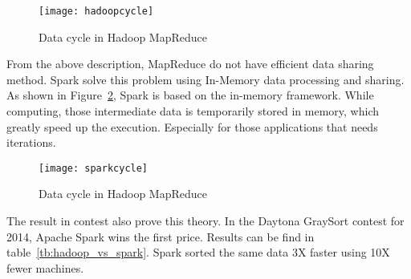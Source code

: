 \begin{figure}[h]
	\centering
	\texttt{[image: hadoopcycle]}
	\caption{Data cycle in Hadoop MapReduce}
	\label{fg:hadoop}
\end{figure}

From the above description, MapReduce do not have efficient data sharing method. Spark solve this problem using In-Memory data processing and sharing\cite{apache_spark}. As shown in Figure~\ref{fg:spark}, Spark is based on the in-memory framework. While computing, those intermediate data is temporarily stored in memory, which greatly speed up the execution. Especially for those applications that needs iterations.

\begin{figure}[h]
	\centering
	\texttt{[image: sparkcycle]}
	\caption{Data cycle in Hadoop MapReduce}
	\label{fg:spark}
\end{figure}

The result in contest also prove this theory. In the Daytona GraySort contest for 2014, Apache Spark wins the first price\cite{3_xin_2014}. Results can be find in table~\ref{tb:hadoop_vs_spark}. Spark sorted the same data 3X faster using 10X fewer machines.
\begin{table}[h]
	\centering
	\caption{Spark TeraSort vs MapReduce\cite{3_xin_2014}}
	\label{tb:hadoop_vs_spark}
\end{table}

